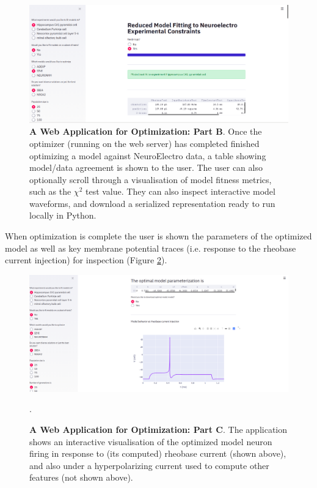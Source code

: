 \begin{figure}
\begin{center}
\includegraphics[scale=1]{chapters/app_tex/app_results}
\end{center}
\caption[Web application (2)]{\textbf{A Web Application for Optimization: Part B}.
Once the optimizer (running on the web server) has completed finished optimizing a model against NeuroElectro data, a table showing model/data agreement is shown to the user.
The user can also optionally scroll through a visualisation of model fitness metrics, such as the $\chi^{2}$ test value.
They can also inspect interactive model waveforms, and download a serialized representation ready to run locally in Python.}
\label{fig:web-app-2}
\end{figure}

When optimization is complete the user is shown the parameters of the optimized model as well as key membrane potential traces (i.e. response to the rheobase current injection) for inspection (Figure \ref{fig:web-app-3}).

\begin{figure}
\begin{center}
\includegraphics[scale=1]{chapters/app_tex/more_app_results}
\end{center}
\caption[Web application (3)]{\textbf{A Web Application for Optimization: Part C}.
The application shows an interactive visualisation of the optimized model neuron firing in response to (its computed) rheobase current (shown above), and also under a hyperpolarizing current used to compute other features (not shown above).}
\label{fig:web-app-3}.
\end{figure}

